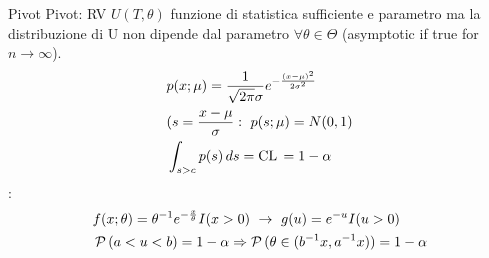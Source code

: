 \documentclass[asd-beamer.tex]{subfiles}%
\begin{document}
\begin{frame}{Pivot}
Pivot: RV $U(T,\theta)$ funzione di statistica sufficiente e parametro ma la distribuzione di U non dipende dal parametro $\forall \theta\in\Theta$ (asymptotic if true for $n\to\infty$).
\begin{align*}
&p(x;\mu)=\frac{1}{\sqrt{2\pi}\sigma}e^{-\frac{(x-\mu)^2}{2\sigma^2}}\\
&(s=\frac{x-\mu}{\sigma}:\ p(s;\mu)=N(0,1)\\
&\int_{s>c}p(s)\,ds=\operatorname{CL}{}=1-\alpha
\end{align*}
:
\begin{align*}
&f(x;\theta)=\invers{\theta}\exp{-\frac{x}{\theta}}I(x>0)\ \to\ g(u)=\exp{-u}I(u>0)\\
&\prob{(a<u<b)}=1-\alpha\Rightarrow\prob{(\theta\in(\invers{b}x,\invers{a}x))}=1-\alpha
\end{align*}
\end{frame}
\end{document}
